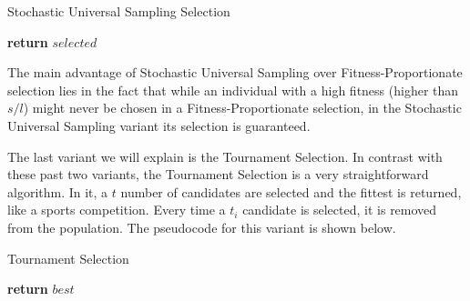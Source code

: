 \begin{algorithm}[H]
    \caption{Stochastic Universal Sampling Selection}
    \begin{algorithmic}[1]
             
             
            \EndIf
             
            \EndFor
        \EndProcedure
            \EndWhile
            \State \textbf{return} $selected$
        \EndProcedure
    \end{algorithmic}
\end{algorithm}

The main advantage of Stochastic Universal Sampling over Fitness-Proportionate selection lies in the fact that while an individual with a high fitness (higher than $s/l$) might never be chosen in a Fitness-Proportionate selection, in the Stochastic Universal Sampling variant its selection is guaranteed.

The last variant we will explain is the Tournament Selection. In contrast with these past two variants, the Tournament Selection is a very straightforward algorithm. In it, a $t$ number of candidates are selected and the fittest is returned, like a sports competition. Every time a $t_{i}$ candidate is selected, it is removed from the population. The pseudocode for this variant is shown below. 

\begin{algorithm}[H]
    \caption{Tournament Selection}
    \begin{algorithmic}[1]
                \EndIf
            \EndFor
            \State \textbf{return} $best$
        \EndProcedure
    \end{algorithmic}
\end{algorithm}



